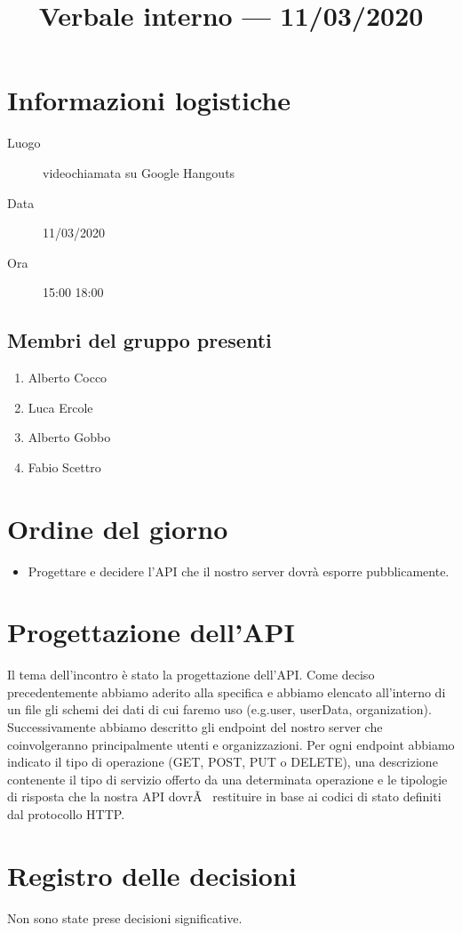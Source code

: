 \documentclass{article}
\title{Verbale interno --- 11/03/2020}
\begin{document}


\section{Informazioni logistiche}%
\label{sec:informazioni_logistiche}

\begin{description}
  \item [Luogo] videochiamata su Google Hangouts
  \item [Data] 11/03/2020
  \item [Ora] 15:00  18:00
\end{description}

\subsection{Membri del gruppo presenti}%
\label{sub:membri_del_gruppo_presenti}

\begin{enumerate}
  \item Alberto Cocco
  \item Luca Ercole
  \item Alberto Gobbo
  \item Fabio Scettro
\end{enumerate}

\section{Ordine del giorno}%
\label{sec:ordine_del_giorno}

\begin{itemize}
  \item Progettare e decidere l'API che il nostro server dovrà esporre pubblicamente.
\end{itemize}

\section{Progettazione dell'API}%
\label{sec:progettazione_API}

Il tema dell'incontro è stato la progettazione dell'API\@.
Come deciso precedentemente abbiamo aderito alla specifica  e abbiamo elencato all'interno di un file  gli schemi  dei dati di cui faremo uso (e.g.user, userData, organization).
Successivamente abbiamo descritto gli endpoint del nostro server che coinvolgeranno principalmente utenti e organizzazioni.
Per ogni endpoint abbiamo indicato il tipo di operazione (GET, POST, PUT o DELETE), una descrizione contenente il tipo di servizio offerto da una determinata operazione e le tipologie di risposta che la nostra API dovrÃ  restituire in base ai codici di stato definiti dal protocollo HTTP\@.
\newpage
\section{Registro delle decisioni}%
\label{sec:registro_delle_decisioni}

Non sono state prese decisioni significative.

\end{document}
